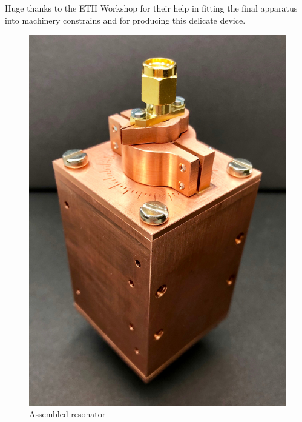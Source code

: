 Huge thanks to the ETH Workshop for their help in fitting the final apparatus into machinery constrains and for producing this delicate device.

\begin{figure}[h]
	\centering
	\includegraphics[width=.91\textwidth]{images/resonator_photo}
	\caption{Assembled resonator}
	\label{fig:resonator_photo}
\end{figure}